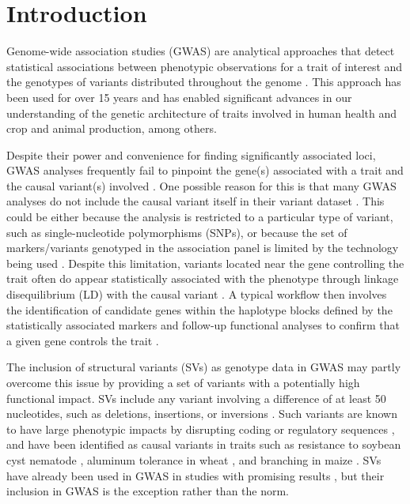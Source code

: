 \section*{Introduction}
\label{sv-gwas-introduction}

Genome-wide association studies (GWAS) are analytical approaches that detect
statistical associations between phenotypic observations for a trait of
interest and the genotypes of variants distributed throughout the
genome \citep{tam2019}. This approach has been used for over 15 years
\citep{visscher2012} and has enabled significant advances in our understanding
of the genetic architecture of traits involved in human health
\citep[e.g.][]{wellcome2007gwas} and crop \citep{tibbs2021} and animal
\citep{ma2019} production, among others.

Despite their power and convenience for finding significantly associated loci,
GWAS analyses frequently fail to pinpoint the gene(s) associated with a trait and
the causal variant(s) involved \citep{tam2019}. One possible reason for this
is that many GWAS analyses do not include the causal variant itself in their variant dataset
\citep{tibbs2021}. This could be either because the analysis
is restricted to a particular type of variant, such as single-nucleotide
polymorphisms (SNPs), or because the set of markers/variants genotyped in the
association panel is limited by the technology being used
\citep[e.g.][]{bandillo2015, sonah2015}. Despite this limitation, variants
located near the gene controlling the trait often do appear statistically
associated with the phenotype through linkage disequilibrium (LD) with the
causal variant \citep{korte2013}.  A typical workflow then involves the
identification of candidate genes within the haplotype blocks defined by the
statistically associated markers and follow-up functional analyses to confirm
that a given gene controls the trait \citep[e.g.][]{wang2018, liu2020ps}.

The inclusion of structural variants (SVs) as genotype data in GWAS may partly overcome
this issue by providing a set of variants with a potentially high functional impact.
SVs include any variant involving a difference of at least 50 nucleotides, such as
deletions, insertions, or inversions \citep{ho2020}. Such variants are known to
have large phenotypic impacts by disrupting coding or regulatory sequences
\citep{marroni2014}, and have been identified as causal variants in traits such
as resistance to soybean cyst nematode \citep{cook2012}, aluminum tolerance in
wheat \citep{maron2013}, and branching in maize \citep{studer2011}.  SVs have
already been used in GWAS in studies with promising results
\citep[e.g.][]{zhang2015, akakpo2020, dominguez2020, liu2020-pangenome}, but
their inclusion in GWAS is the exception rather than the norm.

